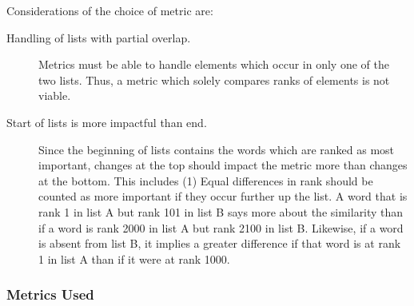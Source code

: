 Considerations of the choice of metric are:

\begin{description}
	\item [Handling of lists with partial overlap.]
	      Metrics must be able to handle elements which occur in only one of the two lists.
	      Thus, a metric which solely compares ranks of elements is not viable.
	\item [Start of lists is more impactful than end.]
	      Since the beginning of lists contains the words which are ranked as most important, changes at the top should impact the metric more than changes at the bottom. This includes (1) Equal differences in rank should be counted as more important if they occur further up the list.
	      A word that is rank 1 in list A but rank 101 in list B says more about the similarity than if a word is rank 2000 in list A but rank 2100 in list B. Likewise, if a word is absent from list B, it implies a greater difference if that word is at rank 1 in list A than if it were at rank 1000.
\end{description}

\subsubsection{Metrics Used}

